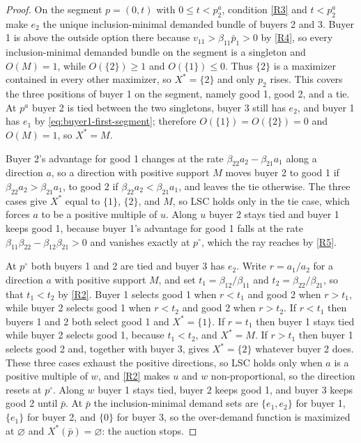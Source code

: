\begin{proof}
On the segment $p=(0,t)$ with $0\le t<p^a_2$, condition \ref{R3} and $t<p^a_2$ make $e_2$ the unique inclusion-minimal demanded bundle of buyers 2 and 3. Buyer 1 is above the outside option there because $v_{11}>\beta_{11}\bar p_1>0$ by \ref{R4}, so every inclusion-minimal demanded bundle on the segment is a singleton and $O(M)=1$, while $O(\{2\})\ge1$ and $O(\{1\})\le0$. Thus $\{2\}$ is a maximizer contained in every other maximizer, so $X^*=\{2\}$ and only $p_2$ rises. This covers the three positions of buyer 1 on the segment, namely good 1, good 2, and a tie. At $p^a$ buyer 2 is tied between the two singletons, buyer 3 still has $e_2$, and buyer 1 has $e_1$ by \eqref{eq:buyer1-first-segment}; therefore $O(\{1\})=O(\{2\})=0$ and $O(M)=1$, so $X^*=M$.

Buyer 2's advantage for good 1 changes at the rate $\beta_{22}a_2-\beta_{21}a_1$ along a direction $a$, so a direction with positive support $M$ moves buyer 2 to good 1 if $\beta_{22}a_2>\beta_{21}a_1$, to good 2 if $\beta_{22}a_2<\beta_{21}a_1$, and leaves the tie otherwise. The three cases give $X^*$ equal to $\{1\}$, $\{2\}$, and $M$, so LSC holds only in the tie case, which forces $a$ to be a positive multiple of $u$. Along $u$ buyer 2 stays tied and buyer 1 keeps good 1, because buyer 1's advantage for good 1 falls at the rate $\beta_{11}\beta_{22}-\beta_{12}\beta_{21}>0$ and vanishes exactly at $p^\circ$, which the ray reaches by \ref{R5}.

At $p^\circ$ both buyers 1 and 2 are tied and buyer 3 has $e_2$. Write $r=a_1/a_2$ for a direction $a$ with positive support $M$, and set $t_1=\beta_{12}/\beta_{11}$ and $t_2=\beta_{22}/\beta_{21}$, so that $t_1<t_2$ by \ref{R2}. Buyer 1 selects good 1 when $r<t_1$ and good 2 when $r>t_1$, while buyer 2 selects good 1 when $r<t_2$ and good 2 when $r>t_2$. If $r<t_1$ then buyers 1 and 2 both select good 1 and $X^*=\{1\}$. If $r=t_1$ then buyer 1 stays tied while buyer 2 selects good 1, because $t_1<t_2$, and $X^*=M$. If $r>t_1$ then buyer 1 selects good 2 and, together with buyer 3, gives $X^*=\{2\}$ whatever buyer 2 does. These three cases exhaust the positive directions, so LSC holds only when $a$ is a positive multiple of $w$, and \ref{R2} makes $u$ and $w$ non-proportional, so the direction resets at $p^\circ$. Along $w$ buyer 1 stays tied, buyer 2 keeps good 1, and buyer 3 keeps good 2 until $\bar p$. At $\bar p$ the inclusion-minimal demand sets are $\{e_1,e_2\}$ for buyer 1, $\{e_1\}$ for buyer 2, and $\{0\}$ for buyer 3, so the over-demand function is maximized at $\varnothing$ and $X^*(\bar p)=\varnothing$: the auction stops.


\end{proof}
